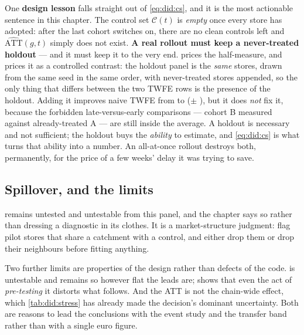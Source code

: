 

One \textbf{design lesson} falls straight out of \cref{eq:did:cs}, and it is the most actionable
sentence in this chapter. The control set $\mathcal C(t)$ is \emph{empty} once every store has
adopted: after the last cohort switches on, there are no clean controls left and
$\widehat{\text{ATT}}(g,t)$ simply does not exist. \textbf{A real rollout must keep a never-treated
holdout} --- and it must keep it to the very end.  prices the half-measure,
and prices it as a controlled contrast: the holdout panel is the \emph{same} \nbEightStagNStores{}
stores, drawn from the same seed in the same order, with \nbEightStagNeverTreated{} never-treated
stores appended, so the only thing that differs between the two TWFE rows is the presence of the
holdout. Adding it improves naive TWFE from \eur{\nbEightTwfeNaive} to \eur{\nbEightTwfeHoldout}
($\pm$ \eur{\nbEightTwfeHoldoutSe}), but it does \emph{not} fix it, because the forbidden
late-versus-early comparisons --- cohort B measured against already-treated A --- are still inside
the average. A holdout is necessary and not sufficient; the holdout buys the \emph{ability} to
estimate, and \cref{eq:did:cs} is what turns that ability into a number. An all-at-once rollout
destroys both, permanently, for the price of a few weeks' delay it was trying to save.

\subsection*{Spillover, and the limits}

 remains untested and untestable from this panel, and the chapter says so rather
than dressing a diagnostic in its clothes. It is a market-structure judgment: flag pilot stores that
share a catchment with a control, and either drop them or drop their neighbours before fitting
anything.

Two further limits are properties of the design rather than defects of the code.  is
untestable and remains so however flat the leads are; \citet{roth2022} shows that even the act of
\emph{pre-testing} it distorts what follows. And the ATT is not the chain-wide effect, which
\cref{tab:did:stress} has already made the decision's dominant uncertainty. Both are reasons to lead
the conclusions with the event study and the transfer band rather than with a single euro figure.

